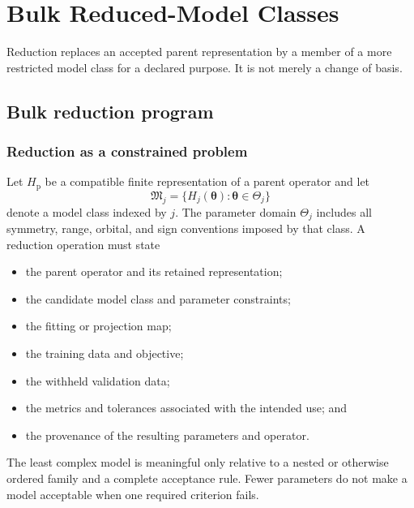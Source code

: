 \chapter{Bulk Reduced-Model Classes}

\label{ch:model-reduction}


Reduction replaces an accepted parent representation by a member of a more
restricted model class for a declared purpose. It is not merely a change of
basis.

\section{Bulk reduction program}

\subsection{Reduction as a constrained problem}


Let $H_{\mathrm p}$ be a compatible finite representation of a parent operator
and let
\begin{equation}
  \mathfrak M_j
  =
  \{H_j(\boldsymbol\theta):\boldsymbol\theta\in\Theta_j\}
\end{equation}
denote a model class indexed by $j$. The parameter domain $\Theta_j$ includes
all symmetry, range, orbital, and sign conventions imposed by that class. A
reduction operation must state

\begin{itemize}
  \item the parent operator and its retained representation;
  \item the candidate model class and parameter constraints;
  \item the fitting or projection map;
  \item the training data and objective;
  \item the withheld validation data;
  \item the metrics and tolerances associated with the intended use; and
  \item the provenance of the resulting parameters and operator.
\end{itemize}

The least complex model is meaningful only relative to a nested or otherwise
ordered family and a complete acceptance rule. Fewer parameters do not make a
model acceptable when one required criterion fails.

